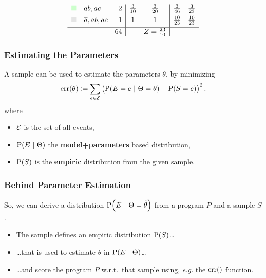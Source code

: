 \documentclass[bigger,xcolor={x11names,svgnames}]{beamer}
\newcommand{\at}[1]{\ensuremath{\!\del{#1}}}
\newcommand{\co}[1]{\ensuremath{\overline{#1}}}
\newcommand{\err}[1]{\ensuremath{\mathrm{err}\at{#1}}}
\newcommand{\fml}[1]{\ensuremath{{\cal #1}}}
\newcommand{\given}{\ensuremath{~\middle|~}}
\newcommand{\pr}[1]{\ensuremath{\mathrm{P}\at{#1}}}
\begin{document}
\begin{frame}
\begin{equation*}
\begin{array}{clr|cc|cc}
            {\color{green!20}\blacksquare }
            & ab, ac
            & 2
            & \frac{3}{10}
            & \frac{3}{20}
            & \frac{3}{46}
            & \frac{3}{23}
            \\[4pt]
            {\color{gray!20}\blacksquare }
            & \co{a}, ab, ac
            & 1
            & 1
            & 1
            & \frac{10}{23}
            & \frac{10}{23}
            \\[4pt]
            \hline
            &
            & 64
            & 
            & Z = \frac{23}{10}
            &
        \end{array}
    \end{equation*}
\end{frame}
%
\begin{frame}
    \frametitle{Estimating the Parameters}
    A \alert{sample} can be used to estimate the parameters $\theta$, by minimizing
    \begin{equation*}
        \err{\theta} := \sum_{e\in\fml{E}} \del{\pr{E = e\given \Theta = \theta} - \pr{S = e}}^2.\label{eq:err.e.s}
    \end{equation*}
    where
    \begin{itemize}
        \item $\fml{E}$ is the set of all events,
        \item $\pr{E\given \Theta}$ the \textbf{model+parameters} based distribution, 
        \item $\pr{S}$ is the \textbf{empiric} distribution from the given sample.
    \end{itemize}  
\end{frame}
%
\begin{frame}
    \frametitle{Behind Parameter Estimation}
    \vfill
    So, we can derive a distribution $\pr{E\given \Theta = \hat{\theta}}$ from a program $P$ and a sample $S$.
    \begin{itemize}
        \item The sample defines an empiric distribution $\pr{S}$\ldots
        \item \ldots that is used to estimate $\theta$ in $\pr{E\given \Theta}$\ldots
        \item \ldots and \alert{score the program} $P$ w.r.t.\ that sample using, \emph{e.g.} the $\err{}$ function.
    \end{itemize}
    \vfill

\end{frame}
\end{document}
